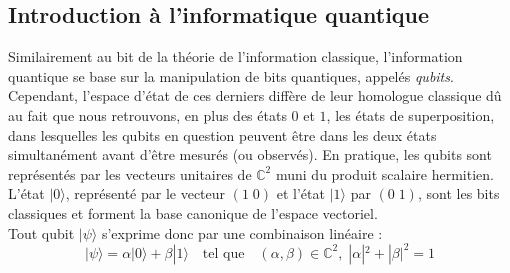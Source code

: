 \subsection{Introduction à l'informatique quantique}
\label{IntroQuant}

Similairement au bit de la théorie de l’information classique, l’information quantique se base sur la manipulation de bits quantiques, appelés \textit{qubits}. Cependant, l’espace d’état de ces derniers diffère de leur homologue classique dû au fait que nous retrouvons, en plus des états \(0\) et \(1\), les états de superposition, dans lesquelles les qubits en question peuvent être dans les deux états simultanément avant d’être mesurés (ou observés). En pratique, les qubits sont représentés par les vecteurs unitaires de \(\mathbb{C}^2 \) muni du produit scalaire hermitien. L’état \(|0\rangle\), représenté par le vecteur \((1\;0)\) et l’état \(|1\rangle\) par \((0\;1)\), sont les bits classiques et forment la base canonique de l’espace vectoriel. 
\\
Tout qubit \(|\psi\rangle\) s’exprime donc par une combinaison linéaire : 
\begin{equation}
|\psi\rangle = \alpha|0\rangle +\beta|1\rangle \quad \text{tel que} \quad (\alpha,\beta) \in \mathbb{C}^2 , \; |\alpha|^2 + |\beta|^2 = 1
\end{equation}

